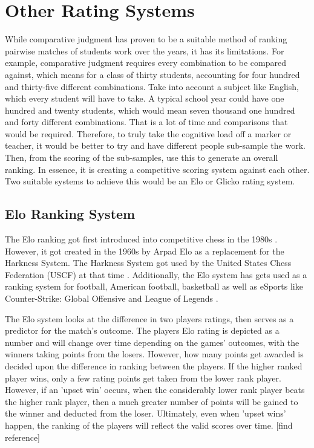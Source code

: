 	\section{Other Rating Systems}
	While comparative judgment has proven to be a suitable method of ranking pairwise matches of students work over the years, it has its limitations. For example, comparative judgment requires every combination to be compared against, which means for a class of thirty students, accounting for four hundred and thirty-five different combinations. Take into account a subject like English, which every student will have to take. A typical school year could have one hundred and twenty students, which would mean seven thousand one hundred and forty different combinations. That is a lot of time and comparisons that would be required. Therefore, to truly take the cognitive load off a marker or teacher, it would be better to try and have different people sub-sample the work. Then, from the scoring of the sub-samples, use this to generate an overall ranking. In essence, it is creating a competitive scoring system against each other. Two suitable systems to achieve this would be an Elo or Glicko rating system.
	
	\subsection{Elo Ranking System}
	The Elo ranking got first introduced into competitive chess in the 1980s \cite{weng2011bayesian}. However, it got created in the 1960s by Arpad Elo as a replacement for the Harkness System. The Harkness System got used by the United States Chess Federation (USCF) at that time \cite{elo1978rating}. Additionally, the Elo system has gets used as a ranking system for football, American football, basketball as well as eSports like Counter-Strike: Global Offensive and League of Legends \cite{silver2015we, pradhan2020power}.
	
	The Elo system looks at the difference in two players ratings, then serves as a predictor for the match's outcome. The players Elo rating is depicted as a number and will change over time depending on the games' outcomes, with the winners taking points from the losers. However, how many points get awarded is decided upon the difference in ranking between the players. If the higher ranked player wins, only a few rating points get taken from the lower rank player. However, if an 'upset win' occurs, when the considerably lower rank player beats the higher rank player, then a much greater number of points will be gained to the winner and deducted from the loser. Ultimately, even when 'upset wins' happen, the ranking of the players will reflect the valid scores over time. [find reference]
	
